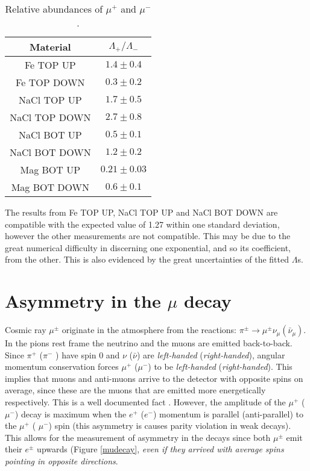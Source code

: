\documentclass[10pt,a4paper,twocolumn]{article}
\begin{document}
\begin{table}[h]
\centering
\begin{tabular}{|c|c|}
\hline
Material & $\Lambda_+/\Lambda_-$ \\
\hline

Fe TOP UP & $1.4 \pm 0.4$ \\
Fe TOP DOWN & $0.3 \pm 0.2$ \\
NaCl TOP UP & $1.7 \pm 0.5$ \\
NaCl TOP DOWN & $2.7 \pm 0.8$ \\
NaCl BOT UP & $0.5 \pm 0.1$ \\
NaCl BOT DOWN & $1.2 \pm 0.2$ \\
Mag BOT UP & $0.21 \pm 0.03$ \\
Mag BOT DOWN & $0.6 \pm 0.1$ \\
\hline
\end{tabular} 
\caption{Relative abundances of $\mu^+$ and $\mu^-$.}
\label{rel_ab}
\end{table}

The results from Fe TOP UP, NaCl TOP UP and NaCl BOT DOWN are compatible with the expected value of 1.27 within one standard deviation, however the other measurements are not compatible. This may be due to the great numerical difficulty in discerning one exponential, and so its coefficient, from the other. This is also evidenced by the great uncertainties of the fitted $\Lambda$s.




\section{Asymmetry in the $\mu$ decay}
Cosmic ray $\mu^{\pm}$ originate in the atmosphere from the reactions: $\pi^{\pm} \rightarrow \mu^{\pm} \nu_{\mu} (\bar{\nu}_{\mu})$. In the pions rest frame the neutrino and the muons are emitted back-to-back. Since $\pi^+$ ($\pi^-$ ) have spin 0 and $\nu$ ($\bar{\nu}$) are \textit{left-handed} (\textit{right-handed}), angular momentum conservation forces $\mu^+$ ($\mu^-$) to be \textit{left-handed} (\textit{right-handed}). This implies that muons and anti-muons arrive to the detector with opposite spins on average, since these are the muons that are emitted more energetically respectively. This is a well documented fact \cite{mupolarized}. However, the amplitude of the $\mu^+$ ( $\mu^-$) decay is maximum when the $e^+$ ($e^-$) momentum is parallel (anti-parallel) to the $\mu^+$ ( $\mu^-$) spin (this asymmetry is causes parity violation in weak decays). This allows for the measurement of asymmetry in the decays since both $\mu^{\pm}$ emit their $e^{\pm}$ upwards (Figure \ref{mudecay}, \textit{even if they arrived with average spins pointing in opposite directions}.
\end{document}
